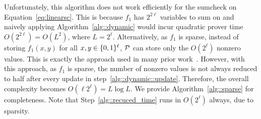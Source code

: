 
Unfortunately, this algorithm does not work efficiently for the sumcheck on Equation~\ref{eq:linearsc}. This is because $f_1$ has $2^{2\ell}$ variables to sum on and naively applying Algorithm~\ref{alg::dynamic} would incur quadratic prover time $O(2^{2\ell}) = O(L^2)$, where $L = 2^\ell$. Alternatively, as $f_1$ is sparse, instead of storing $f_1(x,y)$ for all $x,y\in\binary^\ell$, $\P$ can store only the $O(2^\ell)$ nonzero values. This is exactly the approach used in many prior work~\cite{CMT,wahby2017full,vram}. However, with this approach, as $f_1$ is sparse, the number of nonzero values is not always reduced to half after every update in step~\ref{alg::dynamic::update}. Therefore, the overall complexity becomes $O(\ell 2^\ell) = L\log L$. We provide Algorithm~\ref{alg::sparse} for completeness. Note that Step~\ref{alg::recuced_time} runs in $O(2^\ell)$ always, due to sparsity.

